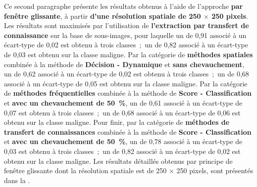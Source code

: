 Ce second paragraphe présente les résultats obtenus à l'aide de l'approche \textbf{par fenêtre glissante}, à partir \textbf{d'une résolution spatiale de 250 $\times$ 250 pixels}. Les résultats sont maximisés par l'utilisation de \textbf{l'extraction par transfert de connaissance} sur la base de sous-images, pour laquelle un \fscore{} de 0,91 associé à un écart-type de 0,02 est obtenu à trois classes~;~un \fscore{} de 0,82 associé à un écart-type de 0,03 est obtenu sur la classe maligne. Par la catégorie de \textbf{méthodes spatiales} combinée à la méthode de \textbf{Décision - Dynamique} et \textbf{sans chevauchement}, un \fscore{} de 0,62 associé à un écart-type de 0,02 est obtenu à trois classes~;~un \fscore{} de 0,68 associé à un écart-type de 0,05 est obtenu sur la classe maligne. Par la catégorie de \textbf{méthodes fréquentielles} combinée à la méthode de \textbf{Score - Classification} et \textbf{avec un chevauchement de 50~\%}, un \fscore{} de 0,61 associé à un écart-type de 0,07 est obtenu à trois classes~;~un \fscore{} de 0,68 associé à un écart-type de 0,06 est obtenu sur la classe maligne. Pour finir, par la catégorie de \textbf{méthodes de transfert de connaissances} combinée à la méthode de \textbf{Score - Classification} et \textbf{avec un chevauchement de 50~\%}, un \fscore{} de 0,78 associé à un écart-type de 0,03 est obtenu à trois classes~;~un \fscore{} de 0,82 associé à un écart-type de 0,02 est obtenu sur la classe maligne. Les résultats détaillés obtenus par principe de fenêtre glissante dont la résolution spatiale est de 250 $\times$ 250 pixels, sont présentés dans la .\par

